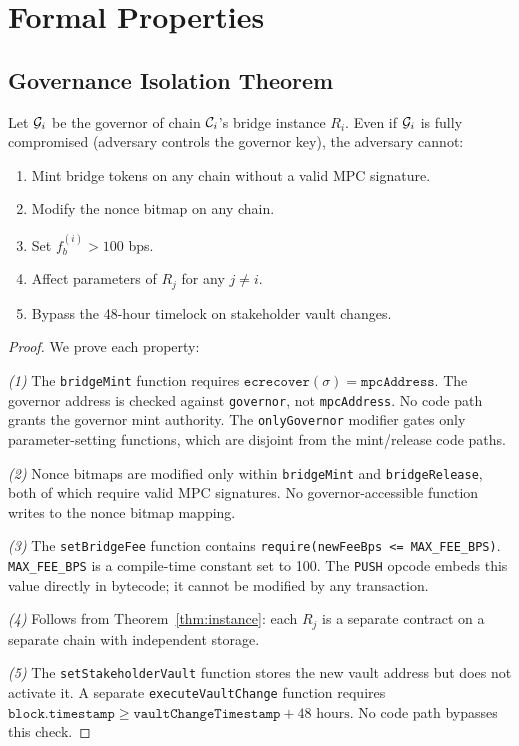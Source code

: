 \section{Formal Properties}

\label{sec:formal}

\subsection{Governance Isolation Theorem}

\begin{theorem}
\label{thm:gov-isolation}
Let $\mathcal{G}_i$ be the governor of chain $\mathcal{C}_i$'s bridge instance $R_i$. Even if $\mathcal{G}_i$ is fully compromised (adversary controls the governor key), the adversary cannot:
\begin{enumerate}[nosep]
  \item Mint bridge tokens on any chain without a valid MPC signature.
  \item Modify the nonce bitmap on any chain.
  \item Set $f_b^{(i)} > 100$ bps.
  \item Affect parameters of $R_j$ for any $j \neq i$.
  \item Bypass the 48-hour timelock on stakeholder vault changes.
\end{enumerate}
\end{theorem}

\begin{proof}
We prove each property:

\emph{(1)} The \texttt{bridgeMint} function requires $\texttt{ecrecover}(\sigma) = \texttt{mpcAddress}$. The governor address is checked against \texttt{governor}, not \texttt{mpcAddress}. No code path grants the governor mint authority. The \texttt{onlyGovernor} modifier gates only parameter-setting functions, which are disjoint from the mint/release code paths.

\emph{(2)} Nonce bitmaps are modified only within \texttt{bridgeMint} and \texttt{bridgeRelease}, both of which require valid MPC signatures. No governor-accessible function writes to the nonce bitmap mapping.

\emph{(3)} The \texttt{setBridgeFee} function contains \texttt{require(newFeeBps <= MAX\_FEE\_BPS)}. \texttt{MAX\_FEE\_BPS} is a compile-time constant set to 100. The \texttt{PUSH} opcode embeds this value directly in bytecode; it cannot be modified by any transaction.

\emph{(4)} Follows from Theorem~\ref{thm:instance}: each $R_j$ is a separate contract on a separate chain with independent storage.

\emph{(5)} The \texttt{setStakeholderVault} function stores the new vault address but does not activate it. A separate \texttt{executeVaultChange} function requires $\texttt{block.timestamp} \geq \texttt{vaultChangeTimestamp} + 48 \text{ hours}$. No code path bypasses this check.
\end{proof}

